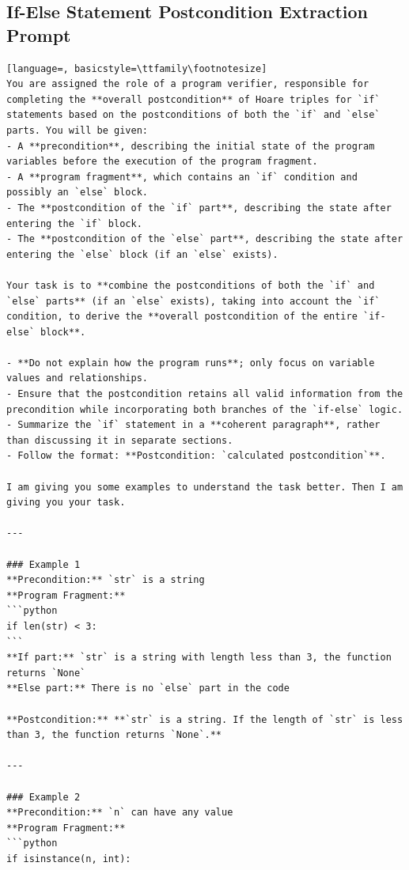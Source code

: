 \documentclass[sigconf]{acmart}
\begin{document}
\subsection{If-Else Statement Postcondition Extraction Prompt}
\label{if_else_prompt}
\begin{tcolorbox}[ colback=gray!10, colframe=black, arc=5pt]
\begin{lstlisting}[language=, basicstyle=\ttfamily\footnotesize]
You are assigned the role of a program verifier, responsible for completing the **overall postcondition** of Hoare triples for `if` statements based on the postconditions of both the `if` and `else` parts. You will be given:
- A **precondition**, describing the initial state of the program variables before the execution of the program fragment.
- A **program fragment**, which contains an `if` condition and possibly an `else` block.
- The **postcondition of the `if` part**, describing the state after entering the `if` block.
- The **postcondition of the `else` part**, describing the state after entering the `else` block (if an `else` exists).

Your task is to **combine the postconditions of both the `if` and `else` parts** (if an `else` exists), taking into account the `if` condition, to derive the **overall postcondition of the entire `if-else` block**.

- **Do not explain how the program runs**; only focus on variable values and relationships.
- Ensure that the postcondition retains all valid information from the precondition while incorporating both branches of the `if-else` logic.
- Summarize the `if` statement in a **coherent paragraph**, rather than discussing it in separate sections.
- Follow the format: **Postcondition: `calculated postcondition`**.

I am giving you some examples to understand the task better. Then I am giving you your task.

---

### Example 1  
**Precondition:** `str` is a string  
**Program Fragment:**  
```python
if len(str) < 3:
```
**If part:** `str` is a string with length less than 3, the function returns `None`  
**Else part:** There is no `else` part in the code  

**Postcondition:** **`str` is a string. If the length of `str` is less than 3, the function returns `None`.**

---

### Example 2  
**Precondition:** `n` can have any value  
**Program Fragment:**  
```python
if isinstance(n, int):
    

\end{lstlisting}
\end{tcolorbox}
\end{document}
